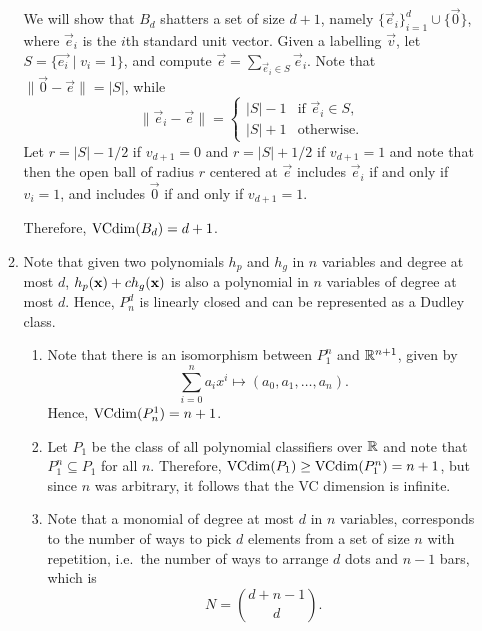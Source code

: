 \begin{ex}
\begin{enumerate}
\begin{enumerate}[1.]
                  We will show that $B_d$ shatters a set of size $d+1$, namely
                  $\{\vec{e}_i\}_{i=1}^{d}\cup\{\vec{0}\}$, where $\vec{e}_i$ is
                  the $i$th standard unit vector. Given a labelling $\vec{v}$,
                  let $S=\{\vec{e_i} \mid v_i=1\}$, and compute
                  $\vec{e}=\sum_{\vec{e}_i\in S} \vec{e}_i$. Note that
                  $\|\vec{0}-\vec{e}\|=|S|$, while
                  \[
                    \|\vec{e}_i-\vec{e}\|=\begin{cases}
                      |S|-1 & \text{if $\vec{e}_i\in S$}, \\
                      |S|+1 & \text{otherwise}.
                    \end{cases}
                  \]
                  Let $r=|S|-1/2$ if $v_{d+1}=0$ and $r=|S|+1/2$ if $v_{d+1}=1$
                  and note that then the open ball of radius $r$ centered at
                  $\vec{e}$ includes $\vec{e}_i$ if and only if $v_i=1$, and
                  includes $\vec{0}$ if and only if $v_{d+1}=1$.

                  Therefore, $\operatorname{VCdim}(B_d)=d+1$.
            \item Note that given two polynomials $h_p$ and $h_g$ in $n$
                  variables and degree at most $d$, $h_p(\mathbf{x})+ch_g(\mathbf{x})$ is also
                  a polynomial in $n$ variables of degree at most $d$. Hence,
                  $P^d_n$ is linearly closed and can be represented as a Dudley
                  class.
                  \begin{enumerate}[1.]
                    \item Note that there is an isomorphism between $P_1^n$ and
                          $\mathbb{R}^{n+1}$, given by
                          \[
                            \sum_{i=0}^n a_ix^i \mapsto (a_0, a_1, \ldots, a_n).
                          \]
                          Hence, $\operatorname{VCdim}(P^1_n)=n+1$.
                    \item Let $P_1$ be the class of all polynomial classifiers
                          over $\mathbb{R}$ and note that $P_1^n\subseteq P_1$ for all
                          $n$. Therefore, $\operatorname{VCdim}(P_1)\geq \operatorname{VCdim}(P_1^n)=n+1$,
                          but since $n$ was arbitrary, it follows that the VC
                          dimension is infinite.
                    \item Note that a monomial of degree at most $d$ in $n$
                          variables, corresponds to the number of ways to pick
                          $d$ elements from a set of size $n$ with repetition,
                          i.e.\ the number of ways to arrange $d$ dots and $n-1$
                          bars, which is
                          \[
                            N={d+n-1 \choose d}.
                          \]


\end{enumerate}
\end{enumerate}
\end{enumerate}
\end{ex}
